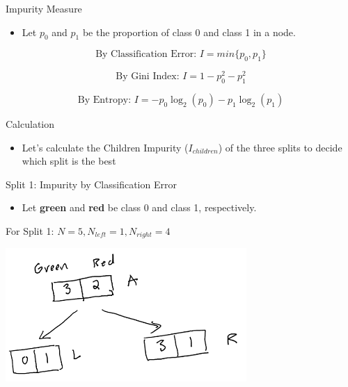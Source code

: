 \documentclass[
  ignorenonframetext,
]{beamer}
\providecommand{\tightlist}{%
  \setlength{\itemsep}{0pt}\setlength{\parskip}{0pt}}
\begin{document}
\begin{frame}{Impurity Measure}
\protect\hypertarget{impurity-measure-4}{}

\begin{itemize}
\tightlist
\item
  Let \(p_0\) and \(p_1\) be the proportion of class 0 and class 1 in a
  node.
\end{itemize}

\[
{\text{By Classification Error: }} I = min\{p_0, p_1\}
\]

\[
{\text{By Gini Index: }} I= 1 - p_0^2-p_1^2 
\]

\[
{\text{By Entropy: }} I = -p_0 \log_2(p_0)-p_1\log_2(p_1) 
\]

\end{frame}

\begin{frame}{Calculation}
\protect\hypertarget{calculation}{}

\begin{itemize}
\tightlist
\item
  Let's calculate the Children Impurity (\(I_{children}\)) of the three
  splits to decide which split is the best
\end{itemize}

\end{frame}

\begin{frame}{Split 1: Impurity by Classification Error}
\protect\hypertarget{split-1-impurity-by-classification-error}{}

\begin{itemize}
\tightlist
\item
  Let \textbf{green} and \textbf{red} be class 0 and class 1,
  respectively.
\end{itemize}

For Split 1: \(N = 5, N_{left} =1, N_{right} = 4\)

\includegraphics{images2/im1.png}

\end{frame}
\end{document}
